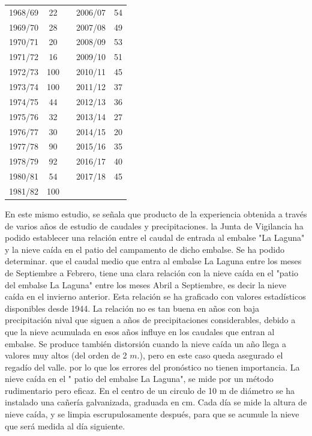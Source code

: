 \documentclass[11pt,]{article}
\begin{document}
\begin{table}[H]
\begin{tabular}{@{}ccccc@{}}
1968/69 & 22 &  & 2006/07 & 54 \\
1969/70 & 28 &  & 2007/08 & 49 \\
1970/71 & 20 &  & 2008/09 & 53 \\
1971/72 & 16 &  & 2009/10 & 51 \\
1972/73 & 100 &  & 2010/11 & 45 \\
1973/74 & 100 &  & 2011/12 & 37 \\
1974/75 & 44 &  & 2012/13 & 36 \\
1975/76 & 32 &  & 2013/14 & 27 \\
1976/77 & 30 &  & 2014/15 & 20 \\
1977/78 & 90 &  & 2015/16 & 35 \\
1978/79 & 92 &  & 2016/17 & 40 \\
1980/81 & 54 &  & 2017/18 & 45 \\
1981/82 & 100 & \multicolumn{1}{l}{} & \multicolumn{1}{l}{} & \multicolumn{1}{l}{} \\ \bottomrule
\end{tabular}
\end{table}


En este mismo estudio, se señala que producto de la experiencia obtenida a través de varios años de estudio de caudales y precipitaciones. la Junta de Vigilancia ha podido establecer una relación entre el caudal de entrada al embalse "La Laguna" y la nieve caída en el patio del campamento de dicho embalse. Se ha podido determinar. que el caudal medio que entra al embalse La Laguna entre los meses de Septiembre a Febrero, tiene una clara relación con la nieve caída en el "patio del embalse La Laguna" entre los meses Abril a Septiembre, es decir la nieve caída en el invierno anterior. Esta relación se ha graficado con valores estadísticos disponibles desde 1944. La relación no es tan buena en años con baja precipitación nival que siguen a años de precipitaciones considerables, debido a que la nieve acumulada en esos años influye en los caudales que entran al embalse. Se produce también distorsión cuando la nieve caída un año llega a valores muy altos (del orden de 2 $m$.), pero en este caso queda asegurado el regadío del valle. por lo que los errores del pronóstico no tienen importancia. La nieve caída en el " patio del embalse La Laguna", se mide por un método rudimentario pero eficaz. En el centro de un circulo de 10 m de diámetro se ha instalado una cañería galvanizada, graduada en cm. Cada día se mide la altura de nieve caída, y se limpia escrupulosamente después, para que se acumule la nieve que será medida al día siguiente.\bigskip
\end{document}
